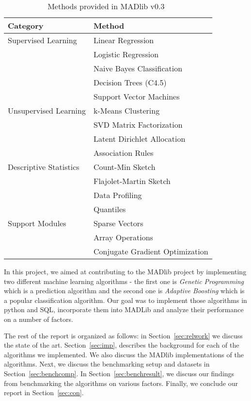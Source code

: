 \begin{table}[!ht]
\centering
\begin{tabular}{|l|l|}
\hline
Category & Method\\
\hline
Supervised Learning & Linear Regression\\
& Logistic Regression\\
& Naive Bayes Classification\\
& Decision Trees (C4.5)\\
& Support Vector Machines\\
\hline
Unsupervised Learning & k-Means Clustering\\
& SVD Matrix Factorization\\
& Latent Dirichlet Allocation\\
& Association Rules\\
\hline
Descriptive Statistics & Count-Min Sketch\\
& Flajolet-Martin Sketch\\
& Data Profiling\\
& Quantiles\\
\hline
Support Modules & Sparse Vectors\\
& Array Operations\\
& Conjugate Gradient Optimization\\
\hline
\end{tabular}
\caption{Methods provided in MADlib v0.3~\cite{madlib12}}
\label{tab:mad}
\end{table}

In this project, we aimed at contributing to the MADlib project by implementing two different machine learning algorithms - the first one is {\itshape Genetic Programming} which is a prediction algorithm and the second one is {\itshape Adaptive Boosting} which is a popular classification algorithm. Our goal was to implement those algorithms in python and SQL, incorporate them into MADLib and analyze their performance on a number of factors.

The rest of the report is organized as follows: in Section~\ref{sec:relwork} we discuss the state of the art. Section~\ref{sec:imp}, describes the background for each of the algorithms we implemented. We also discuss the MADlib implementations of the algorithms. Next, we discuss the benchmarking setup and datasets in Section~\ref{sec:benchcomp}. In Section~\ref{sec:benchresult}, we discuss our findings from benchmarking the algorithms on various factors. Finally, we conclude our report in Section~\ref{sec:con}.
